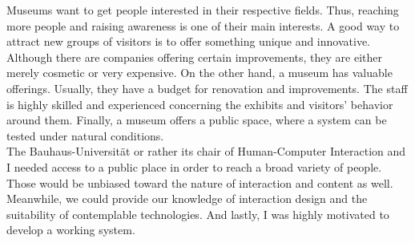Museums want to get people interested in their respective fields. Thus, reaching more people and raising awareness is one of their main interests. A good way to attract new groups of visitors is to offer something unique and innovative. Although there are companies offering certain improvements, they are either merely cosmetic or very expensive. On the other hand, a museum has valuable offerings. Usually, they have a budget for renovation and improvements. The staff is highly skilled and experienced concerning the exhibits and visitors' behavior around them. Finally, a museum offers a public space, where a system can be tested under natural conditions.
\\ 
The Bauhaus-Universität or rather its chair of Human-Computer Interaction and I needed access to a public place in order to reach a broad variety of people. Those would be unbiased toward the nature of interaction and content as well. Meanwhile, we could provide our knowledge of interaction design and the suitability of contemplable technologies. And lastly, I was highly motivated to develop a working system.

%

